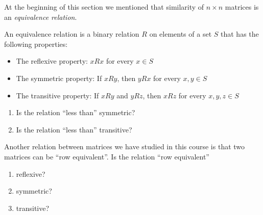 \documentclass{ximera}
\begin{document}
\begin{problem}\label{prob:lessthan}
At the beginning of this section we mentioned that similarity of $n \times n$ matrices is an \emph{equivalence relation}.


 
An equivalence relation is a binary relation $R$ on elements of a set $S$ that has the following properties:
\begin{itemize}
\item The reflexive property:  $x R x$ for every $x \in S$
\item The symmetric property:  If $x R y$, then $y R x$ for every $x,y \in S$
\item The transitive property:  If $x R y$ and $y R z$, then $x R z$ for every $x,y,z \in S$
\end{itemize}
 
 
\begin{enumerate}
\item
Is the relation ``less than'' symmetric? 
\item
Is the relation ``less than'' transitive? 
\end{enumerate}
\end{problem}

 
\begin{problem}\label{prob:lessthan3}
Another relation between matrices we have studied in this course is that two matrices can be ``row equivalent''.  Is the relation ``row equivalent''
\begin{enumerate}
    \item reflexive? 
    \item symmetric? 
    \item transitive? 
\end{enumerate}
 
\end{problem}
\end{document}
